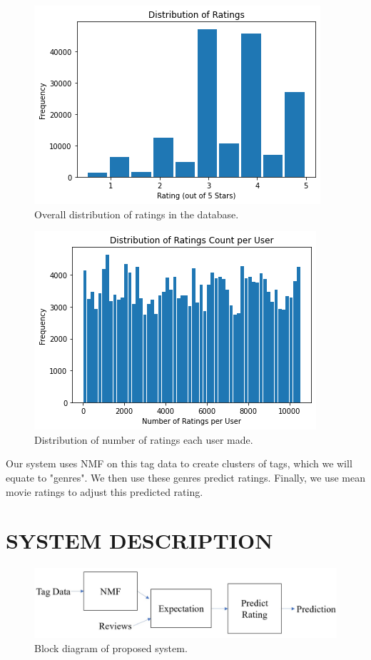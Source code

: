 \documentclass[letterpaper, 10 pt, conference]{ieeeconf}  %
\begin{document}
\begin{figure}[h]
    \includegraphics[scale=0.5]{figs/ratingdist.png}
    \caption{Overall distribution of ratings in the database.}
\end{figure}

\begin{figure}[h]
    \includegraphics[scale=0.5]{figs/ratingsperuser.png}
    \caption{Distribution of number of ratings each user made.}
\end{figure}

Our system uses NMF on this tag data to create clusters of tags, which we will equate to "genres". We then use these genres predict ratings. Finally, we use mean movie ratings to adjust this predicted rating.


\section{SYSTEM DESCRIPTION}

\begin{figure}[h]
   \includegraphics[scale=0.5]{./figs/blockdiagram.jpg}
   \caption{Block diagram of proposed system.}
\end{figure}
\end{document}
